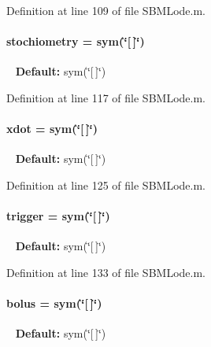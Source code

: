 Definition at line 109 of file S\+B\+M\+Lode.\+m.

\hypertarget{class_s_b_m_lode_a8d6dd1568c43b32f1810a5fe9ef6100f}{}
\paragraph[{stochiometry}]{\setlength{\rightskip}{0pt plus 5cm}stochiometry = sym(\char`\"{}\mbox{[}$\,$\mbox{]}\char`\"{})}\label{class_s_b_m_lode_a8d6dd1568c43b32f1810a5fe9ef6100f}
~\newline
{\bfseries Default\+:} sym(\char`\"{}\mbox{[}$\,$\mbox{]}\char`\"{}) 

Definition at line 117 of file S\+B\+M\+Lode.\+m.

\hypertarget{class_s_b_m_lode_a914ee05b8f01d45602316710ca4b8a43}{}
\paragraph[{xdot}]{\setlength{\rightskip}{0pt plus 5cm}xdot = sym(\char`\"{}\mbox{[}$\,$\mbox{]}\char`\"{})}\label{class_s_b_m_lode_a914ee05b8f01d45602316710ca4b8a43}
~\newline
{\bfseries Default\+:} sym(\char`\"{}\mbox{[}$\,$\mbox{]}\char`\"{}) 

Definition at line 125 of file S\+B\+M\+Lode.\+m.

\hypertarget{class_s_b_m_lode_ae194cb817eae4085f8023885100c68dd}{}
\paragraph[{trigger}]{\setlength{\rightskip}{0pt plus 5cm}trigger = sym(\char`\"{}\mbox{[}$\,$\mbox{]}\char`\"{})}\label{class_s_b_m_lode_ae194cb817eae4085f8023885100c68dd}
~\newline
{\bfseries Default\+:} sym(\char`\"{}\mbox{[}$\,$\mbox{]}\char`\"{}) 

Definition at line 133 of file S\+B\+M\+Lode.\+m.

\hypertarget{class_s_b_m_lode_ab9227561ac246ee4b70f9e65c25ffda7}{}
\paragraph[{bolus}]{\setlength{\rightskip}{0pt plus 5cm}bolus = sym(\char`\"{}\mbox{[}$\,$\mbox{]}\char`\"{})}\label{class_s_b_m_lode_ab9227561ac246ee4b70f9e65c25ffda7}
~\newline
{\bfseries Default\+:} sym(\char`\"{}\mbox{[}$\,$\mbox{]}\char`\"{}) 

